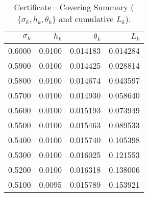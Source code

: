\begin{table}[H]
\centering
\caption{Certificate—Covering Summary ($\{\sigma_k,h_k,\theta_k\}$ and cumulative $L_k$).}
\label{tab:covering-summary}
\begin{tabular}{r r r r}
\toprule
$\sigma_k$ & $h_k$ & $\theta_k$ & $L_k$ \\
\midrule
0.6000 & 0.0100 & 0.014183 & 0.014284 \\
0.5900 & 0.0100 & 0.014425 & 0.028814 \\
0.5800 & 0.0100 & 0.014674 & 0.043597 \\
0.5700 & 0.0100 & 0.014930 & 0.058640 \\
0.5600 & 0.0100 & 0.015193 & 0.073949 \\
0.5500 & 0.0100 & 0.015463 & 0.089533 \\
0.5400 & 0.0100 & 0.015740 & 0.105398 \\
0.5300 & 0.0100 & 0.016025 & 0.121553 \\
0.5200 & 0.0100 & 0.016318 & 0.138006 \\
0.5100 & 0.0095 & 0.015789 & 0.153921 \\
\bottomrule
\end{tabular}
\end{table}
